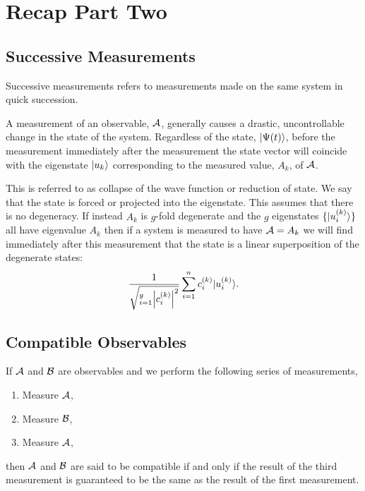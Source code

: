 \section{Recap Part Two}
\subsection{Successive Measurements}
Successive measurements refers to measurements made on the same system in quick succession.
\begin{postulate}{}{}
    A measurement of an observable, \(\mathcal{A}\), generally causes a drastic, uncontrollable change in the state of the system.
    Regardless of the state, \(\vert {\Psi(t)} \rangle\), before the measurement immediately after the measurement the state vector will coincide with the eigenstate \(\vert {u_k} \rangle\) corresponding to the measured value, \(A_k\), of \(\mathcal{A}\).
\end{postulate}
This is referred to as collapse of the wave function or reduction of state.
We say that the state is forced or projected into the eigenstate.
This assumes that there is no degeneracy.
If instead \(A_k\) is \(g\)-fold degenerate and the \(g\) eigenstates \(\{\vert {u_i^{(k)}} \rangle\}\) all have eigenvalue \(A_k\) then if a system is measured to have \(\mathcal{A} = A_k\) we will find immediately after this measurement that the state is a linear superposition of the degenerate states:
\[\frac{1}{\sqrt{_{i=1}^{g} \abs{c_i^{(k)}}^2}} \sum_{i=1}^{n} c_i^{(k)}\vert {u_i^{(k)}} \rangle.\]

\subsection{Compatible Observables}
If \(\mathcal{A}\) and \(\mathcal{B}\) are observables and we perform the following series of measurements,
\begin{enumerate}
    \item Measure \(\mathcal{A}\),
    \item Measure \(\mathcal{B}\),
    \item Measure \(\mathcal{A}\),
\end{enumerate}
then \(\mathcal{A}\) and \(\mathcal{B}\) are said to be compatible if and only if the result of the third measurement is guaranteed to be the same as the result of the first measurement.

